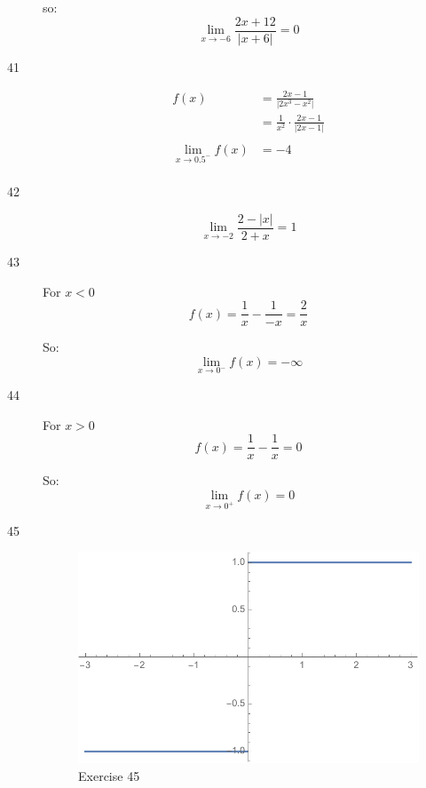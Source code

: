 \documentclass[letterpaper]{exam}
\begin{document}
\begin{description}
        so:
        \[
          \lim_{x \to -6} \frac{2x + 12}{|x + 6|} = \boxed{ 0 }
        \]

      \item[41]
        \begin{align*}
          f(x) & = \frac{2x - 1}{|2x^3 - x^2|} \\
               & = \frac{1}{x^2} \cdot \frac{2x - 1}{|2x - 1|} \\
          \\
          \lim_{x \to 0.5^-} f(x) &= \boxed{ -4 } \\
        \end{align*}
        
      \item[42] 
        \[
          \lim_{x \to -2} \frac{2 - |x|}{2 + x} = \boxed{ 1 }
        \]

      \item[43]
        For $x < 0$
        \[
          f(x) = \frac{1}{x} - \frac{1}{-x} = \frac{2}{x}
        \]

        So:
        \[
          \lim_{x \to 0^-} f(x) = \boxed{ - \infty }
        \]

      \item[44]
        For $x > 0$
        \[
          f(x) = \frac{1}{x} - \frac{1}{x} = 0
        \]

        So:
        \[
          \lim_{x \to 0^+} f(x) = \boxed{ 0 }
        \]

      \item[45]
        \begin{figure}[H]
          \centering
          \includegraphics[scale = 0.5]{ex45.pdf}
          \caption{Exercise 45}
          \label{fig:ex45}
        \end{figure}


\end{description}
\end{document}
